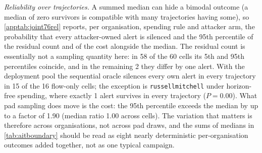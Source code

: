 \emph{Reliability over trajectories.} A summed median can hide a bimodal outcome (a median of
zero survivors is compatible with many trajectories having some), so \cref{apptab:joint76rel} reports,
per organisation, spending rule and attacker arm, the probability that every attacker-owned alert is
silenced and the 95th percentile of the residual count and of the cost alongside the median. The
residual count is essentially not a sampling quantity here: in 58 of the
60 cells its 5th and 95th percentiles coincide, and in the remaining 2 they
differ by one alert. With the deployment pool the sequential oracle silences every own alert in
every trajectory in 15 of the 16 flow-only cells; the exception is
\texttt{russellmitchell} under horizon-free spending, where exactly 1 alert survives in every trajectory ($P=0.00$). What pad sampling does move is the cost: the 95th percentile exceeds the median by
up to a factor of 1.90 (median ratio 1.00 across cells). The
variation that matters is therefore across organisations, not across pad draws, and the sums of
medians in \cref{tab:aitboundary} should be read as eight nearly deterministic per-organisation
outcomes added together, not as one typical campaign.
